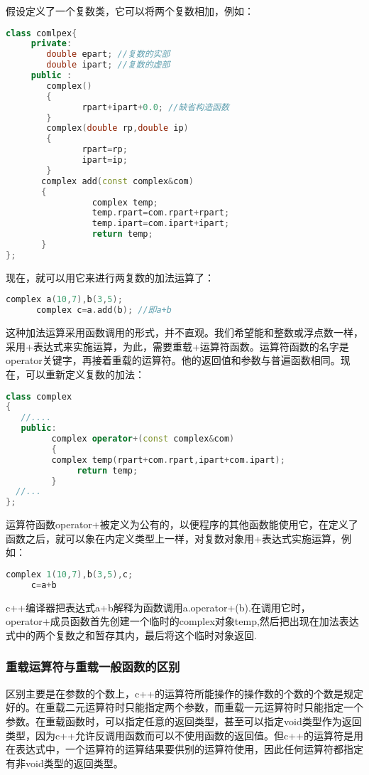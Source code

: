 \documentclass{article}
\begin{document}
假设定义了一个复数类，它可以将两个复数相加，例如：
\begin{lstlisting}[language=c++]
class comlpex{
     private:
        double epart; //复数的实部
        double ipart; //复数的虚部
     public :
        complex()
        { 
               rpart+ipart+0.0; //缺省构造函数
        }
        complex(double rp,double ip)
        {
               rpart=rp;
               ipart=ip;
        }
       complex add(const complex&com)
       {
                 complex temp;
                 temp.rpart=com.rpart+rpart;
                 temp.ipart=com.ipart+ipart;
                 return temp;
       }       
};
\end{lstlisting}
现在，就可以用它来进行两复数的加法运算了：
\begin{lstlisting}[language=c++]
      complex a(10,7),b(3,5);
      complex c=a.add(b); //即a+b
\end{lstlisting}
这种加法运算采用函数调用的形式，并不直观。我们希望能和整数或浮点数一样，采用+表达式来实施运算，为此，需要重载+运算符函数。运算符函数的名字是operator关键字，再接着重载的运算符。他的返回值和参数与普遍函数相同。现在，可以重新定义复数的加法：
\begin{lstlisting}[language=c++]
class complex
{
   //....
   public: 
         complex operator+(const complex&com)
         { 
         complex temp(rpart+com.rpart,ipart+com.ipart);
              return temp;
         }
  //...
};
\end{lstlisting}
运算符函数operator+被定义为公有的，以便程序的其他函数能使用它，在定义了函数之后，就可以象在内定义类型上一样，对复数对象用+表达式实施运算，例如：
\begin{lstlisting}[language=c++]
     complex 1(10,7),b(3,5),c;
     c=a+b
\end{lstlisting}
c++编译器把表达式a+b解释为函数调用a.operator+(b).在调用它时，operator+成员函数首先创建一个临时的complex对象temp,然后把出现在加法表达式中的两个复数之和暂存其内，最后将这个临时对象返回.

\subsubsection{重载运算符与重载一般函数的区别}
\label{sec-9-1-1}

区别主要是在参数的个数上，c++的运算符所能操作的操作数的个数的个数是规定好的。在重载二元运算符时只能指定两个参数，而重载一元运算符时只能指定一个参数。在重载函数时，可以指定任意的返回类型，甚至可以指定void类型作为返回类型，因为c++允许反调用函数而可以不使用函数的返回值。但c++的运算符是用在表达式中，一个运算符的运算结果要供别的运算符使用，因此任何运算符都指定有非void类型的返回类型。
\end{document}
